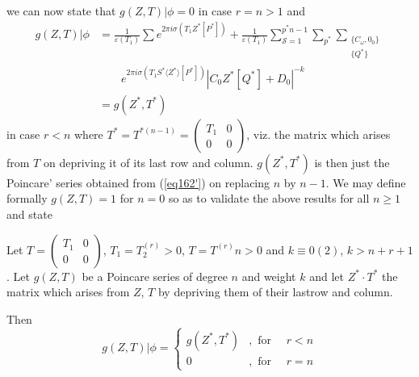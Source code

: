 \noindent
we can now state that $g(Z, T)| \phi=0$ in case $r=n > 1$ and
\begin{align*}
g(Z, T)| \phi &=\frac{1}{\varepsilon (T_1)}\sum e^{2 \pi i \sigma
  (T_1Z^*[P^*])}+\frac{1}{\varepsilon  (T_1)}\sum^{p^*
  n-1}_{\mathscr{S}=1}\sum_{p^*} \sum_{\substack{\{ C_\omega,
    0_0\}\\ \{ Q^*  \}}}\\
& \qquad e^{2 \pi i \sigma(T_1 S^* \langle
  Z^*\rangle[P^*])}|C_0Z^*[Q^*]+D_0|^{-k}\\ 
&=g(Z^*, T^*)
\end{align*}
in case $r <n$ where $T^*=T^{*(n-1)}=\begin{pmatrix}T_1 & 0 \\ 0 &
0 \end{pmatrix}$, viz. the matrix which arises from $T$ on depriving
it of its last row and column. $g(Z^*, T^*)$ is then just the
Poincare' series obtained from (\ref{eq162'}) on replacing $n$ by $n-1$. We
may define formally $g(Z, T)=1$ for $n=0$ so as to validate the above
results for all $n \geq 1$ and state 


\setcounter{thm}{11}
\begin{thm}\label{chap11:thm12}%
Let $T=\begin{pmatrix}T_1 & 0 \\ 0 & 0 \end{pmatrix}$,
$T_1=T_2^{(r)}>0$, $T=T^{(r)} n>0$ and $k \equiv 0(2)$, $k
>n+r+1$. Let  $g(Z, T)$ be a Poincare series  of degree 
$n$  and  weight  $k$ and let $Z^* \cdot T^*$   the matrix
  which arises from $Z$, $T$  by depriving them of their
  last\pageoriginale row and column. 
\end{thm}

 Then 
\begin{equation*}
g(Z, T)|\phi=
\begin{cases}
g({Z}^*, T^*)  &, \text{ for }  \quad r < n\\ 0 &, \text{ for } \quad
r=n\tag{190}\label{eq190}  
\end{cases}
\end{equation*}

